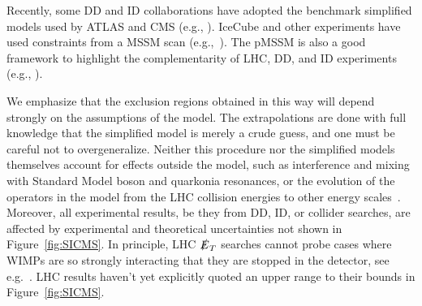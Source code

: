 \documentclass{ar-1col}
\newcommand{\MET}{\ensuremath{\slashed{E}_T}\xspace}
\begin{document}
{Recently, some DD and ID collaborations have adopted the benchmark
simplified models used by ATLAS and CMS (e.g.,
). IceCube and other
experiments have used constraints from a MSSM scan (e.g.,~). The pMSSM is also a good framework
to highlight the complementarity of LHC, DD, and ID experiments (e.g.,
).

\begin{marginnote}[]
\end{marginnote}

We emphasize that the exclusion regions obtained in this
way will depend strongly on the assumptions of the model. The
extrapolations are done with full knowledge that the simplified
model is merely a crude guess, and one must be careful not to
overgeneralize. Neither this procedure nor the
simplified models themselves account for effects outside the
model, such as interference and mixing with Standard Model boson and quarkonia
resonances, or the evolution of the operators in the model from
the LHC collision energies to other energy
scales~\cite{DEramo:2014nmf}. Moreover, all experimental results,
be they from DD, ID, or collider searches, are affected by experimental and
theoretical uncertainties not shown in Figure~\ref{fig:SICMS}.
In principle, LHC \MET searches cannot probe cases where 
WIMPs are so strongly interacting that they are
stopped in the detector, see e.g.~\cite{Daci:2015hca}. 
LHC results haven't yet explicitly quoted an upper range to
their bounds in Figure~\ref{fig:SICMS}. 

}
\end{document}
